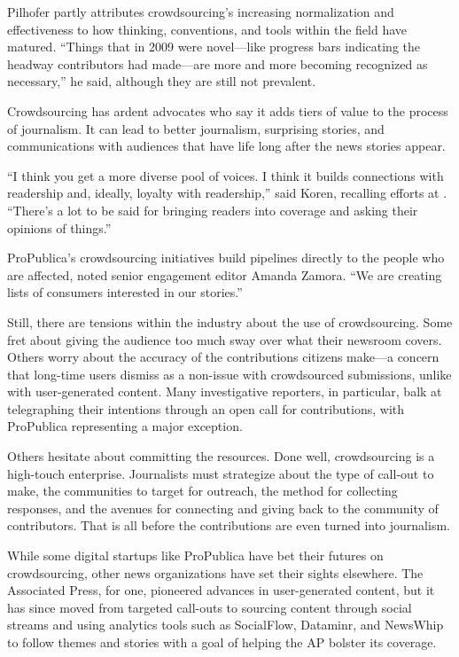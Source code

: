 \begin{itemize}
Pilhofer partly attributes crowdsourcing’s increasing normalization and effectiveness to how thinking, conventions, and tools within the field have matured. ``Things that in 2009 were novel---like progress bars indicating the headway contributors had made---are more and more becoming recognized as necessary,'' he said, although they are still not prevalent.

Crowdsourcing has ardent advocates who say it adds tiers of value to the process of journalism. It can lead to better journalism, surprising stories, and communications with audiences that have life long after the news stories appear.

``I think you get a more diverse pool of voices. I think it builds connections with readership and, ideally, loyalty with readership,'' said Koren, recalling efforts at . ``There’s a lot to be said for bringing readers into coverage and asking their opinions of things.''\autocite{Koren}

ProPublica’s crowdsourcing initiatives build pipelines directly to the people who are affected, noted senior engagement editor Amanda Zamora. ``We are creating lists of consumers interested in our stories.''\autocite{Zamora}

Still, there are tensions within the industry about the use of crowdsourcing. Some fret about giving the audience too much sway over what their newsroom covers. Others worry about the accuracy of the contributions citizens make---a concern that long-time users dismiss as a non-issue with crowdsourced submissions, unlike with user-generated content. Many investigative reporters, in particular, balk at telegraphing their intentions through an open call for contributions, with ProPublica representing a major exception.

Others hesitate about committing the resources. Done well, crowdsourcing is a high-touch enterprise. Journalists must strategize about the type of call-out to make, the communities to target for outreach, the method for collecting responses, and the avenues for connecting and giving back to the community of contributors. That is all before the contributions are even turned into journalism.  

While some digital startups like ProPublica have bet their futures on crowdsourcing, other news organizations have set their sights elsewhere. The Associated Press, for one, pioneered advances in user-generated content, but it has since moved from targeted call-outs to sourcing content through social streams and using analytics tools such as SocialFlow, Dataminr, and NewsWhip to follow themes and stories with a goal of helping the AP bolster its coverage. 


\end{itemize}

